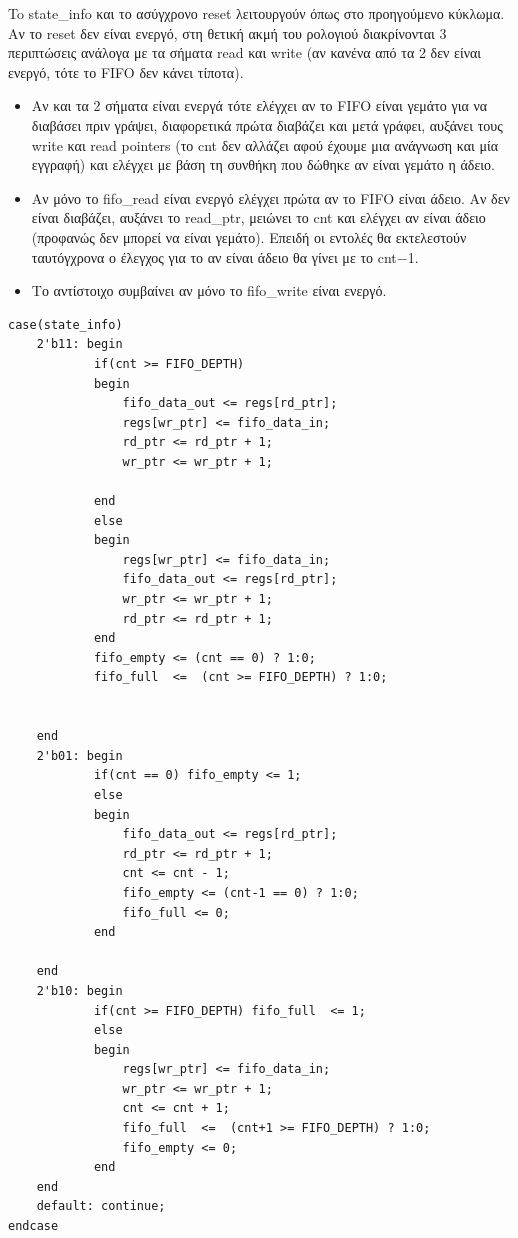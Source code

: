 \documentclass[12pt]{article}
\begin{document}
To state\_info και το ασύγχρονο reset λειτουργούν όπως στο προηγούμενο κύκλωμα. Αν το reset δεν είναι ενεργό, στη θετική
ακμή του ρολογιού διακρίνονται 3 περιπτώσεις ανάλογα με τα σήματα read και write (αν κανένα από τα 2 δεν είναι ενεργό, τότε
το FIFO δεν κάνει τίποτα). 
\begin{itemize}
\item Αν και τα 2 σήματα είναι ενεργά τότε ελέγχει αν το FIFO είναι γεμάτο για να διαβάσει πριν γράψει, 
διαφορετικά πρώτα διαβάζει και μετά γράφει, αυξάνει τους write και read pointers (το cnt δεν αλλάζει αφού έχουμε μια ανάγνωση και μία εγγραφή) 
και ελέγχει με βάση τη συνθήκη που δώθηκε αν είναι γεμάτο η άδειο.
\item Αν μόνο το fifo\_read είναι ενεργό ελέγχει πρώτα αν το FIFO είναι άδειο. Αν δεν είναι διαβάζει, αυξάνει το read\_ptr,
μειώνει το cnt και ελέγχει αν είναι άδειο (προφανώς δεν μπορεί να είναι γεμάτο). Επειδή οι εντολές θα εκτελεστούν ταυτόγχρονα
ο έλεγχος για το αν είναι άδειο θα γίνει με το cnt$-$1.
\item Το αντίστοιχο συμβαίνει αν μόνο το fifo\_write είναι ενεργό. 
\end{itemize} 
\begin{verbatim} 
case(state_info)
    2'b11: begin
            if(cnt >= FIFO_DEPTH)
            begin
                fifo_data_out <= regs[rd_ptr];
                regs[wr_ptr] <= fifo_data_in;
                rd_ptr <= rd_ptr + 1;
                wr_ptr <= wr_ptr + 1;
                
            end
            else
            begin
                regs[wr_ptr] <= fifo_data_in;
                fifo_data_out <= regs[rd_ptr];
                wr_ptr <= wr_ptr + 1;
                rd_ptr <= rd_ptr + 1;
            end
            fifo_empty <= (cnt == 0) ? 1:0;
            fifo_full  <=  (cnt >= FIFO_DEPTH) ? 1:0;


    end
    2'b01: begin
            if(cnt == 0) fifo_empty <= 1;
            else 
            begin
                fifo_data_out <= regs[rd_ptr];
                rd_ptr <= rd_ptr + 1;
                cnt <= cnt - 1;
                fifo_empty <= (cnt-1 == 0) ? 1:0;
                fifo_full <= 0;
            end
            
    end 
    2'b10: begin
            if(cnt >= FIFO_DEPTH) fifo_full  <= 1;
            else
            begin
                regs[wr_ptr] <= fifo_data_in;
                wr_ptr <= wr_ptr + 1;
                cnt <= cnt + 1;
                fifo_full  <=  (cnt+1 >= FIFO_DEPTH) ? 1:0;
                fifo_empty <= 0;
            end
    end
    default: continue;
endcase
\end{verbatim}
\end{document}
